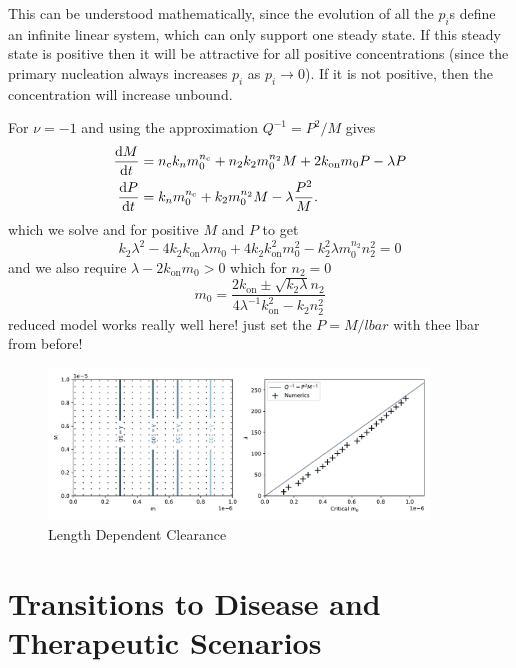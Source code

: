 This can be understood mathematically, since the evolution of all the $p_i$s define an infinite linear system, which can only support one steady state. If this steady state is positive then it will be attractive for all positive concentrations (since the primary nucleation always increases  $p_i$ as $p_i \to 0$). If it is not positive, then the concentration will increase unbound.  

For $\nu=-1$ and using the approximation $Q^{-1}=P^2 / M$ gives
\begin{align}
    \frac{\text{d}M}{\text{d}t}&= n_{\mathrm{c}} k_n m_0^{n_{\mathrm{c}}} + n_2 k_2 m_0^{n_2} M + 2 k_\text{on} m_0 P - \lambda P \\
    \frac{\text{d}P}{\text{d}t}&= k_n m_0^{n_{\mathrm{c}}} + k_2 m_0^{n_2} M - \lambda \frac{P^2}{M}.
    \label{eq:4-nudependent}
\end{align}
which we solve and for positive $M$ and $P$ to get
\begin{equation}
k_2 \lambda^2 - 4 k_2 k_\text{on} \lambda m_0 + 4 k_2 k_\text{on}^2 m_0^{2} - k_2^2 \lambda m_0^{n_2} n_2^2 = 0
\end{equation}
and we also require $\lambda - 2 k_\text{on} m_0 > 0$ which for $n_2 = 0$
\begin{equation}
m_0 = \frac{2 k_\text{on} \pm \sqrt{k_2\lambda} n_2}{4 \lambda^{-1} k_\text{on}^2 - k_2 n_2^2}
\end{equation}
reduced model works really well here! just set the $P=M/lbar$ with thee lbar from before!

\begin{figure}
    \centering
    \includegraphics[width=0.9\textwidth]{figures/numinus1sidebyside.pdf}
    \caption{Length Dependent Clearance}
    \label{fig:4-numinus1}
\end{figure}

\section{Transitions to Disease and Therapeutic Scenarios}

